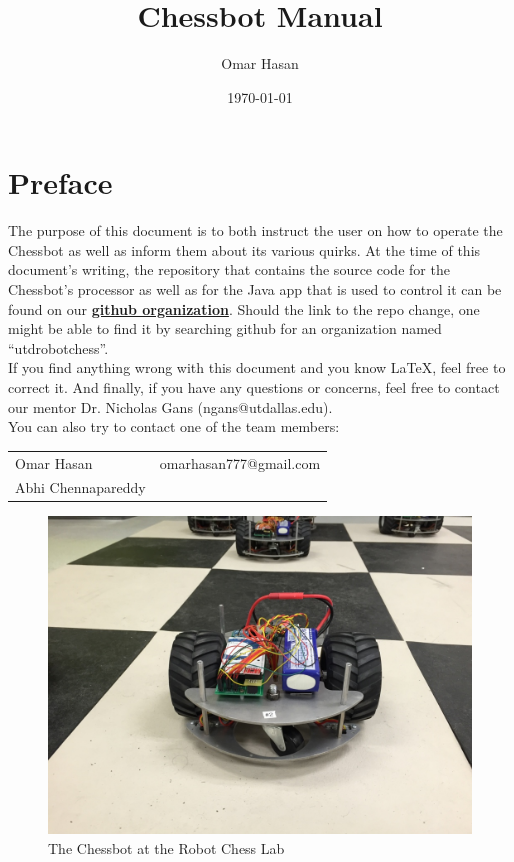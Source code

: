 \documentclass[letterpaper,12pt]{report}
\newcommand{\github}{\href{https://github.com/utdrobotchess}
        {\textbf{github organization}}}
\begin{document}
\title{\textbf{Chessbot Manual}}
\author{Omar Hasan}

\date{\today}
\maketitle

\pagebreak

\section*{Preface}
\label{sec:preface}
The purpose of this document is to both instruct the user on how to operate the
Chessbot as well as inform them about its various quirks. At the time of this
document's writing, the repository that contains the source code for the
Chessbot's processor as well as for the Java app that is used to control it can
be found on our \github. Should the link to the repo change, one might be able
to find it by searching github for an organization named ``utdrobotchess''.\\

If you find anything wrong with this document and you know LaTeX, feel free to
correct it. And finally, if you have any questions or concerns, feel free to
contact our mentor Dr. Nicholas Gans (ngans@utdallas.edu).\\

You can also try to contact one of the team members:\\
\begin{center}
\begin{tabular}{l l}
    Omar Hasan & omarhasan777@gmail.com \\
    Abhi Chennapareddy &
\end{tabular}
\end{center}

\begin{figure}[!h]
\centering
\includegraphics[width=14cm]{./pics/chessbot-front.jpg}
    \caption{The Chessbot at the Robot Chess Lab}
\end{figure}
\end{document}
